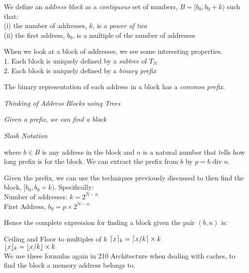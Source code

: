 We define an \textit{address block} as a \textit{contiguous} set of numbers, $B = [b_0,b_0+k)$ such that:\\
(i) the number of addresses, $k$, is a \textit{power of two}\\
(ii) the first address, $b_0$, is a multiple of the number of addresses

When we look at a block of addresses, we see some interesting properties. \\
1. Each block is uniquely defined by a \textit{subtree} of $T_N$\\
2. Each block is uniquely defined by a \textit{binary prefix} 

The binary representation of each address in a block has a \textit{common prefix}. 


\frmrule 

\textit{Thinking of Address Blocks using Trees}


\frmrule 

\textit{Given a prefix, we can find a block}




\frmrule 

\textit{Slash Notation}

where $b \in B$ is any address in the block and $n$ is a natural number 
that tells how long prefix is for the block. We can extract the prefix 
from $b$ by $p = b \text{ div } n$. 

Given the prefix, 
we can use the techniques previously discussed to then find the
block, $[b_0,b_0+k)$. Specifically:\\
Number of addresses: $k = 2^{N-n}$ \\
First Address, $b_0 = p \times 2^{N-n} $ 

Hence the complete expression for finding a block given the pair $(b,n)$ is:



\begin{sidenote}{Ceiling and Floor to multiples of $k$}
$\lceil x\rceil_k = \lceil x/k\rceil \times k$\\
$\lfloor x\rfloor_k = \lfloor x/k\rfloor \times k$\\
We use these formulas again in 210 Architecture when dealing with caches, to find 
the block a memory address belongs to. 
\end{sidenote}

\frmrule 

